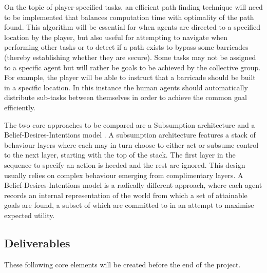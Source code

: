 \documentclass[12pt,a4paper]{article}
\begin{document}
On the topic of player-specified tasks, an efficient path finding technique will need to be implemented that balances computation time with optimality of the path found. This algorithm will be essential for when agents are directed to a specified location by the player, but also useful for attempting to navigate when performing other tasks or to detect if a path exists to bypass some barricades (thereby establishing whether they are secure). Some tasks may not be assigned to a specific agent but will rather be goals to be achieved by the collective group. For example, the player will be able to instruct that a barricade should be built in a specific location. In this instance the human agents should automatically distribute sub-tasks between themselves in order to achieve the common goal efficiently.

The two core approaches to be compared are a Subsumption architecture \cite{brooks90} and a Belief-Desires-Intentions model \cite{rao95}. A subsumption architecture features a stack of behaviour layers where each may in turn choose to either act or subsume control to the next layer, starting with the top of the stack. The first layer in the sequence to specify an action is heeded and the rest are ignored. This design usually relies on complex behaviour emerging from complimentary layers. A Belief-Desires-Intentions model is a radically different approach, where each agent records an internal representation of the world from which a set of attainable goals are found, a subset of which are committed to in an attempt to maximise expected utility.

\subsection{Deliverables}\noindent
These following core elements will be created before the end of the project.
\end{document}

